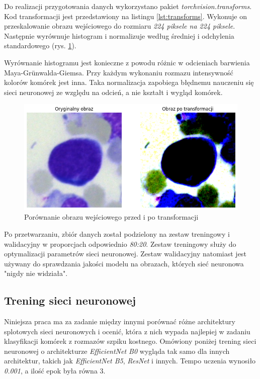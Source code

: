 Do realizacji przygotowania danych wykorzystano pakiet \textit{torchvision.transforms}.
Kod transformacji jest przedstawiony na listingu \ref{lst:transforms}.
Wykonuje on przeskalowanie obrazu wejściowego do rozmiaru \textit{224 piksele na 224 piksele}.
Następnie wyrównuje histogram i normalizuje według średniej i odchylenia standardowego (rys. \ref{fig:transformations_example}).

Wyrównanie histogramu jest konieczne z powodu różnic w odcieniach barwienia Maya-Grünwalda-Giemsa.
Przy każdym wykonaniu rozmazu intensywność kolorów komórek jest inna.
Taka normalizacja zapobiega błędnemu nauczeniu się sieci neuronowej ze względu na odcień, a nie kształt i wygląd komórek.

\begin{figure}
    \centering
    \includegraphics[width=\textwidth]{image_transform}
    \caption{Porównanie obrazu wejściowego przed i po transformacji}
    \label{fig:transformations_example}
\end{figure}

Po przetwarzaniu, zbiór danych został podzielony na zestaw treningowy i walidacyjny w proporcjach odpowiednio \textit{80:20}.
Zestaw treningowy służy do optymalizacji parametrów sieci neuronowej.
Zestaw walidacyjny natomiast jest używany do sprawdzania jakości modelu na obrazach, których sieć neuronowa "nigdy nie widziała".

\subsection{Trening sieci neuronowej}

Niniejsza praca ma za zadanie między innymi porównać różne architektury splotowych sieci neuronowych i ocenić,
która z nich wypada najlepiej w zadaniu klasyfikacji komórek z rozmazów szpiku kostnego.
Omówiony poniżej trening sieci neuronowej o architekturze \textit{EfficientNet B0} wygląda tak samo dla innych architektur, takich jak \textit{EfficientNet B5}, \textit{ResNet} i innych.
Tempo uczenia wynosiło \textit{0.001}, a ilość epok była równa 3.

